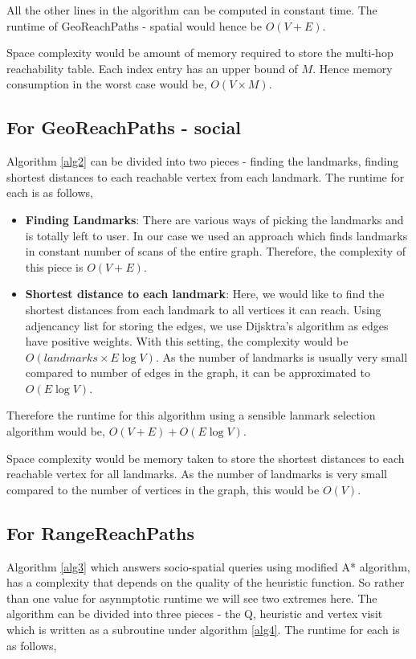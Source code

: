 All the other lines in the algorithm can be computed in constant time. The runtime of GeoReachPaths - spatial would hence be $O(V + E)$.

Space complexity would be amount of memory required to store the multi-hop reachability table. Each index entry has an upper bound of $M$. Hence memory consumption in the worst case would be, $O(V \times M)$.

\subsection{For GeoReachPaths - social}
Algorithm \ref{alg2} can be divided into two pieces - finding the landmarks, finding shortest distances to each reachable vertex from each landmark. The runtime for each is as follows,
\begin{itemize}
	\item \textbf{Finding Landmarks}: There are various ways of picking the landmarks and is totally left to user. In our case we used an approach which finds landmarks in constant number of scans of the entire graph. Therefore, the complexity of this piece is $O(V + E)$.
	\item \textbf{Shortest distance to each landmark}: Here, we would like to find the shortest distances from each landmark to all vertices it can reach. Using adjencancy list for storing the edges, we use Dijsktra's algorithm as edges have positive weights. With this setting, the complexity would be $O(landmarks \times E\log V)$. As the number of landmarks is usually very small compared to number of edges in the graph, it can be approximated to $O(E\log V)$.
\end{itemize}

Therefore the runtime for this algorithm using a sensible lanmark selection algorithm would be, $O(V + E) + O(E\log V)$.

Space complexity would be memory taken to store the shortest distances to each reachable vertex for all landmarks. As the number of landmarks is very small compared to the number of vertices in the graph, this would be $O(V)$.

\subsection{For RangeReachPaths}
Algorithm \ref{alg3} which answers socio-spatial queries using modified A* algorithm, has a complexity that depends on the quality of the heuristic function. So rather than one value for asynmptotic runtime we will see two extremes here. The algorithm can be divided into three pieces - the Q, heuristic and vertex visit which is written as a subroutine under algorithm \ref{alg4}. The runtime for each is as follows,

